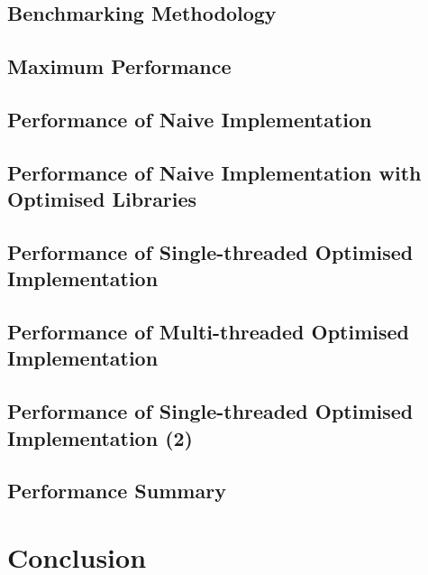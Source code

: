 \documentclass[10pt, twocolumn]{scrartcl} %
\begin{document}
\subsection{Benchmarking Methodology}

\subsection{Maximum Performance}

\subsection{Performance of Naive Implementation}

\subsection{Performance of Naive Implementation with Optimised Libraries}

\subsection{Performance of Single-threaded Optimised Implementation}

\subsection{Performance of Multi-threaded Optimised Implementation}

\subsection{Performance of Single-threaded Optimised Implementation (2)}

\subsection{Performance Summary}


\section{Conclusion}


\printbibliography

\end{document}
